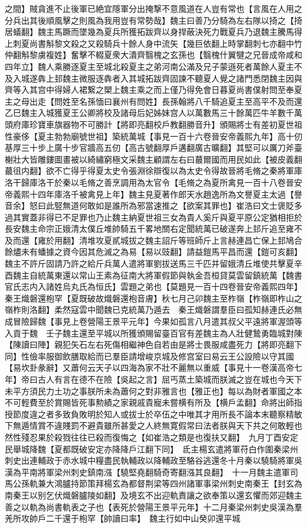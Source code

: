 之間】賊貪進不止後軍已絶宜隱軍分出掩撃不意風道在人豈有常也【言風在人用之分兵出其後順風擊之則風為我用豈有常勢哉】魏主曰善乃分騎為左右隊以掎之【掎居蟻翻】魏主馬蹶而墜幾為夏兵所獲拓跋齊以身捍蔽決死力戰夏兵乃退魏主騰馬得上刺夏尚書斛黎文殺之又殺騎兵十餘人身中流矢【幾巨依翻上時掌翻刺七亦翻中竹仲翻斛黎虜複姓】奮擊不輟夏衆大潰齊翳槐之玄孫也【翳槐什翼犍之兄晉成帝咸和四年立】魏人乘勝逐夏主至城北殺夏主之弟河南公滿及兄子蒙遜死者萬餘人夏主不及入城遂犇上邽魏主微服逐犇者入其城拓跋齊固諫不聽夏人覺之諸門悉閉魏主因與齊等入其宫中得婦人裙繋之槊上魏主乘之而上僅乃得免會日暮夏尚書僕射問至奉夏主之母出走【問姓至名孫愐曰襄州有問姓】長孫翰將八千騎追夏主至高平不及而還乙巳魏主入城獲夏王公卿將校及諸母后妃姊妹宫人以萬數馬三十餘萬匹牛羊數千萬頭府庫珍寶車旗器物不可勝計【將即亮翻校戶教翻勝音升】頒賜將士有差初夏世祖性豪侈【夏主勃勃廟號世祖】築統萬城【事見一百十六卷晉安帝義熙九年】高十仞基厚三十步上廣十步官牆高五仞【高古號翻厚戶遘翻廣古曠翻】其堅可以厲刀斧臺榭壯大皆雕鏤圖畫被以綺繡窮極文采魏主顧謂左右曰蕞爾國而用民如此【被皮義翻蕞徂内翻】欲不亡得乎得夏太史令張淵徐辯復以為太史令得故晉將毛脩之秦將軍庫洛干歸庫洛干於秦以毛脩之善烹調用為太官令【毛脩之為夏所禽見一百十八卷晉安帝義熙十四年庫洛千被禽見上年】魏主見夏著作郎天水趙逸所為文譽夏主太過【譽音余】怒曰此竪無道何敢如是誰所為邪當速推之【欲案其罪也】崔浩曰文士褒貶多過其實蓋非得已不足罪也乃止魏主納夏世祖三女為貴人奚斤與夏平原公定猶相拒於長安魏主命宗正娥清太僕丘堆帥騎五千畧地關右定聞統萬已破遂奔上邽斤追至雍不及而還【雍於用翻】清堆攻夏貳城拔之魏主詔斤等班師斤上言赫連昌亡保上邽鳩合餘燼未有蟠據之資今因其危滅之為易【易以豉翻】請益鎧馬平昌而還【鎧可亥翻】魏主不許斤固請乃許之給斤兵萬人遣將軍劉拔送馬三千匹并留娥清丘堆使共擊夏辛酉魏主自統萬東還以常山王素為征南大將軍假節與執金吾桓貸莫雲留鎮統萬【魏書官氏志内入諸姓烏丸氏為恒氏】雲題之弟也【莫題見一百十四卷晉安帝義熙四年】　秦王熾磐還枹罕【夏既破故熾磐還枹音膚】秋七月己卯魏主至柞嶺【柞嶺即柞山之嶺柞則洛翻】柔然寇雲中聞魏已克統萬乃遁去　秦王熾磐謂羣臣曰孤知赫連氏必無成冒險歸魏【事見上卷營陽王景平元年】今果如孤言八月遣其叔父平遠將軍渥頭等入貢于魏　壬子魏主還至平城以所獲頒賜留臺百官有差魏主為人壯健鷙勇臨城對陳【陳讀曰陣】親犯矢石左右死傷相繼神色自若由是將士畏服咸盡死力【將即亮翻下同】性儉率服御飲膳取給而已羣臣請增峻京城及修宫室曰易云王公設險以守其國【易坎卦彖辭】又蕭何云天子以四海為家不壯不麗無以重威【事見十一卷漢高帝七年】帝曰古人有言在德不在險【吳起之言】屈丐蒸土築城而朕滅之豈在城也今天下未平方須民力土功之事朕所未為蕭何之對非雅言也【雅正也】每以為財者軍國之本不可輕費至於賞賜皆死事勲績之家親戚貴寵未嘗横有所及【横戶孟翻】命將出師指授節度違之者多致負敗明於知人或拔士於卒伍之中唯其才用所長不論本末聽察精敏下無遁情賞不違賤罰不避貴雖所甚愛之人終無寛假常曰法者朕與天下共之何敢輕也然性殘忍果於殺戮往往已殺而復悔之【如崔浩之類是也復扶又翻】　九月丁酉安定民舉城降魏【夏都既破安定亦降降戶江翻下同】　氐主楊玄遣將軍苻白作圍秦梁州刺史出連輔政于赤水城中糧盡民執輔政以降輔政至駱谷逃還冬十月秦以驍騎將軍吳漢為平南將軍梁州刺史鎮南漒【驍堅堯翻騎奇寄翻漒其良翻】　十一月魏主遣軍司馬公孫軌兼大鴻臚持節策拜楊玄為都督荆梁等四州諸軍事梁州刺史南秦王【封玄為南秦王以别乞伏熾磐臚陵如翻】及境玄不出迎軌責讓之欲奉策以還玄懼而郊迎魏主善之以軌為尚書軌表之子也【表死於營陽王景平元年】十二月秦梁州刺史吳漢為羣羌所攻帥戶二千還于枹罕【帥讀曰率】　魏主行如中山癸卯還平城

